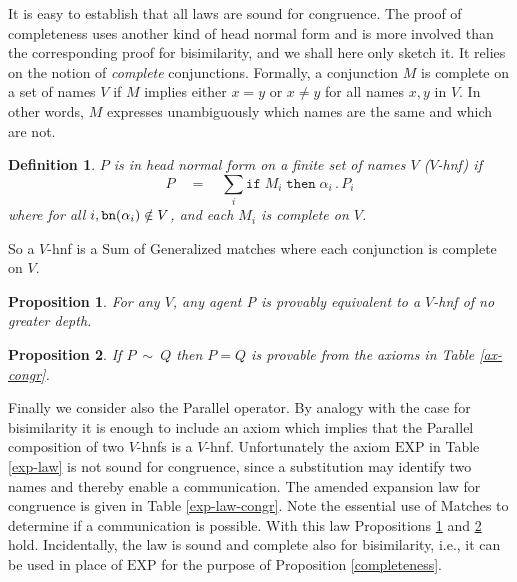 \documentclass[10pt,a4paper]{article}
\newcommand{\ifthen}[2]{\texttt{if}\;#1\;\texttt{then}\;#2}
\newcommand{\prefix}[2]{{#1}\,.\,#2}
\newcommand{\bn}{\texttt{bn}}
\newcommand{\rulname}[1]{\scriptstyle \text{#1}}
\newcommand{\congr}{\:\sim\:}
\newtheorem{theorem}{Proposition}
\newtheorem{definition}{Definition}
\begin{document}
It is easy to establish that all laws are sound for congruence. The proof of completeness uses another kind of head normal form and is more involved than the corresponding proof for bisimilarity, and we shall here only sketch it. It relies on the notion of \emph{complete} conjunctions. Formally, a conjunction $M$ is complete on a set of names $V$ if $M$ implies either $x = y$ or $x \neq y$ for all names $x,y$ in $V$. In other words, $M$ expresses unambiguously which names are the same and which are not.

\begin{definition} \label{vhnf}
$P$ is in \textnormal{head normal form on a finite set of names $V$ ($V$-hnf)} if 
\textnormal{
\[
	P \quad = \quad \sum_i \ifthen{M_i}{\prefix{\alpha_i}{P_i}}
\]
}
where for all $i, \textnormal{$\bn(\alpha_i)$} \notin V$, and each $M_i$ is complete on $V$.
\end{definition}

So a $V$-hnf is a Sum of Generalized matches where each conjunction is complete on $V$.

\begin{theorem} \label{vhnf-eq}
For any $V$, any agent P is provably equivalent to a $V$-hnf of no greater depth.
\end{theorem}

\begin{theorem} \label{compl-congr}
If $P \congr Q$ then $P = Q$ is provable from the axioms in Table \ref{ax-congr}.
\end{theorem}

Finally we consider also the Parallel operator. By analogy with the case for bisimilarity it is enough to include an axiom which implies that the Parallel composition of two $V$-hnfs is a $V$-hnf. Unfortunately the axiom $\rulname{EXP}$ in Table \ref{exp-law} is not sound for congruence, since a substitution may identify two names and thereby enable a communication. The amended expansion law for congruence is given in Table \ref{exp-law-congr}. Note the essential use of Matches to determine if a communication is possible. With this law Propositions \ref{vhnf-eq} and \ref{compl-congr} hold. Incidentally, the law is sound and complete also for bisimilarity, i.e., it can be used in place of $\rulname{EXP}$ for the purpose of Proposition \ref{completeness}.
\end{document}

